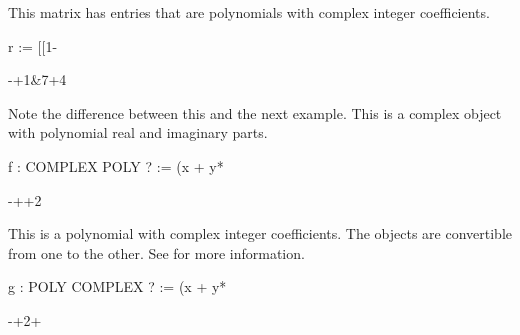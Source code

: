 \begin{xtc}
\begin{xtccomment}
This matrix has entries that are polynomials with complex integer
coefficients.
\end{xtccomment}
\begin{spadsrc}
r := [[1-%
\end{spadsrc}
\begin{TeXOutput}
\begin{fricasmath}{10}
\begin{MATRIX}{2}-{\ImaginaryI \TIMES {}}+1&7\TIMES {}+4%
\TIMES \ImaginaryI \end{MATRIX}%
\end{fricasmath}
\end{TeXOutput}
\end{xtc}
%
\begin{xtc}
\begin{xtccomment}
Note the difference between this and the next example.
This is a complex object with polynomial real and imaginary parts.
\end{xtccomment}
\begin{spadsrc}
f : COMPLEX POLY ? := (x + y*%
\end{spadsrc}
\begin{TeXOutput}
\begin{fricasmath}{11}
-{}++2\TIMES {}\TIMES %
\TIMES \ImaginaryI %
\end{fricasmath}
\end{TeXOutput}
\end{xtc}
\begin{xtc}
\begin{xtccomment}
This is a polynomial with complex integer coefficients.
The objects are convertible from one to the other.
See  for more information.
\end{xtccomment}
\begin{spadsrc}
g : POLY COMPLEX ? := (x + y*%
\end{spadsrc}
\begin{TeXOutput}
\begin{fricasmath}{12}
-{}+2\TIMES \ImaginaryI \TIMES {}\TIMES {}+%
\end{fricasmath}
\end{TeXOutput}
\end{xtc}


